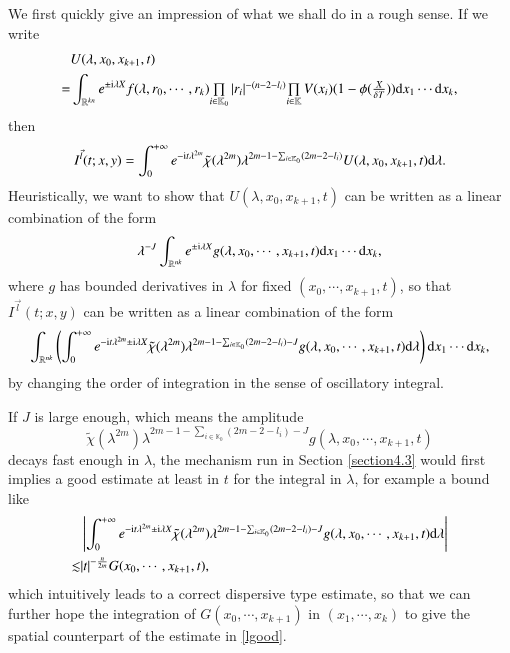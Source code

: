 \documentclass[11pt,reqno]{amsart}
\def\d{{\rm d}}
\numberwithin{equation}{section}
\theoremstyle{definition}
\begin{document}
We first quickly give an impression of what we shall do in a rough sense. If we write
\begin{equation}\label{U}
	\begin{split}
		&U(\lambda,x_0,x_{k+1},t)\\
		=&\int_{\mathbb{R}^{kn}}e^{\pm\mathrm{i}\lambda X}f(\lambda,r_0,\cdots,r_k)\mbox{$\prod\limits_{i\in\mathbb{K}_0}|r_i|^{-(n-2-l_i)}$}\mbox{$\prod\limits_{i\in\mathbb{K}}V(x_i)$}(1-\phi(\mbox{$\frac{X}{\delta T}$}))\d x_1\cdots \d x_k,
	\end{split}
\end{equation}
then
\begin{equation*}
	I^{\vec{l}}(t;x,y)=\int_0^{+\infty}e^{-\mathrm{i}t\lambda^{2m}}\tilde{\chi}(\lambda^{2m})\lambda^{2m-1-\sum_{i\in\mathbb{K}_0}(2m-2-l_i)}U(\lambda,x_0,x_{k+1},t)\d\lambda.
\end{equation*}
Heuristically, we want to show that $U(\lambda,x_0,x_{k+1},t)$ can be written as a linear combination of the form
\begin{equation}\label{decaylambda}
		\lambda^{-J}\int_{\mathbb{R}^{nk}}e^{\pm\mathrm{i}\lambda X}g(\lambda,x_0,\cdots,x_{k+1},t)\d x_1\cdots\d x_k,
\end{equation}
where $g$ has bounded derivatives in $\lambda$ for fixed $(x_0,\cdots,x_{k+1},t)$, so that $I^{\vec{l}}(t;x,y)$ can be written as a linear combination of the form
\begin{equation*}
	\int_{\mathbb{R}^{nk}}\left(\int_0^{+\infty}e^{-\mathrm{i}t\lambda^{2m}\pm\mathrm{i}\lambda X}\tilde{\chi}(\lambda^{2m})\lambda^{2m-1-\sum_{i\in\mathbb{K}_0}(2m-2-l_i)-J}g(\lambda,x_0,\cdots,x_{k+1},t)\d\lambda\right)\d x_1\cdots\d x_k,
\end{equation*}
by changing the order of integration in the sense of oscillatory integral. 

If $J$ is large enough, which means the amplitude
\begin{equation}\label{amplitude}
	\tilde{\chi}(\lambda^{2m})\lambda^{2m-1-\sum_{i\in\mathbb{K}_0}(2m-2-l_i)-J}g(\lambda,x_0,\cdots,x_{k+1},t)
\end{equation}
 decays fast enough in $\lambda$, the mechanism run in Section \ref{section4.3} would first implies a good estimate at least in $t$ for the integral in $\lambda$, for example a bound like
\begin{equation}\label{firstinlambda}
	\begin{split}
		&\left|\int_0^{+\infty}e^{-\mathrm{i}t\lambda^{2m}\pm\mathrm{i}\lambda X}\tilde{\chi}(\lambda^{2m})\lambda^{2m-1-\sum_{i\in\mathbb{K}_0}(2m-2-l_i)-J}g(\lambda,x_0,\cdots,x_{k+1},t)\d\lambda\right|\\
		\lesssim&|t|^{-\frac{n}{2m}}G(x_0,\cdots,x_{k+1},t),
	\end{split}
\end{equation}
which intuitively leads to a correct dispersive type estimate, so that we can further hope the integration of $G(x_0,\cdots,x_{k+1})$ in $(x_1,\cdots,x_k)$ to give the spatial counterpart of the estimate in \eqref{lgood}.
\end{document}
